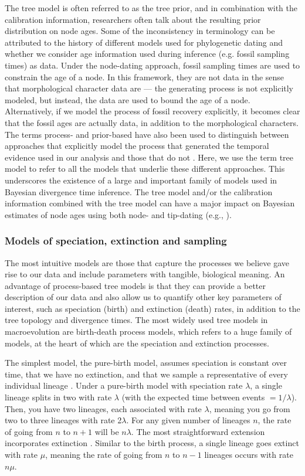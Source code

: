 The tree model is often referred to as the tree prior, and in combination with the calibration information, researchers often talk about the resulting prior distribution on node ages.
Some of the inconsistency in terminology can be attributed to the history of different models used for phylogenetic dating and whether we consider age information used during inference (e.g. fossil sampling times) as data.
Under the node-dating approach, fossil sampling times are used to constrain the age of a node.
In this framework, they are not data in the sense that morphological character data are --- the generating process is not explicitly modeled, but instead, the data are used to bound the age of a node.
Alternatively, if we model the process of fossil recovery explicitly, it becomes clear that the fossil ages are actually data, in addition to the morphological characters.
The terms process- and prior-based have also been used to distinguish between approaches that explicitly model the  process that generated the temporal evidence used in our analysis and those that do not \citep{Landis2016}. 
Here, we use the term tree model to refer to all the models that underlie these different approaches.
This underscores the existence of a large and important family of models used in Bayesian divergence time inference.
The tree model and/or the calibration information combined with the tree model can have a major impact on Bayesian estimates of node ages using both node- and tip-dating (e.g., \citep{Ho2009,Warnock2011,OReilly2015,matzke2016,Matschiner2017}).

\subsubsection{Models of speciation, extinction and sampling}

The most intuitive models are those that capture the processes we believe gave rise to our data and include parameters with tangible, biological meaning.
An advantage of process-based tree models is that they can provide a better description of our data and also allow us to quantify other key parameters of interest, such as speciation (birth) and extinction (death) rates, in addition to the tree topology and divergence times.
The most widely used tree models in macroevolution are birth-death process models, which refers to a huge family of models, at the heart of which are the speciation and extinction processes. 

The simplest model, the pure-birth model, assumes speciation is constant over time, that we have no extinction, and that we sample a representative of every individual lineage \citep{Yule1925}.
Under a pure-birth model with speciation rate $\lambda$, a single lineage splits in two with rate $\lambda$ (with the expected time between events $=1/\lambda$). Then, you have two lineages, each associated with rate $\lambda$, meaning you go from two to three lineages with rate 2$\lambda$. For any given number of lineages $n$, the rate of going from $n$ to $n+1$ will be $n\lambda$.
The most straightforward extension incorporates  extinction \citep{Kendall1948}.
Similar to the birth process, a single lineage goes extinct with rate $\mu$, meaning the rate of going from $n$ to $n-1$ lineages occurs with rate $n\mu$.

